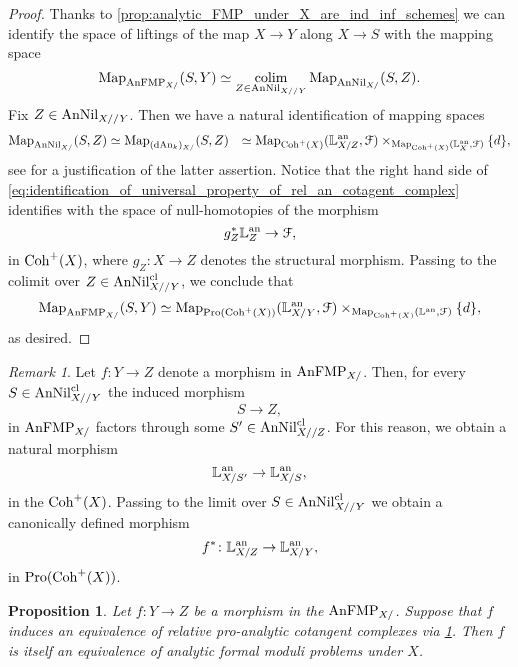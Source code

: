 \documentclass[10pt,a4paper,reqno]{amsart} %
\theoremstyle{plain}
\newtheorem{prop}[thm]{Proposition}
\theoremstyle{definition}
\theoremstyle{remark}
\newtheorem{rem}[thm]{Remark}
\numberwithin{equation}{section}
\begin{document}
\begin{proof}
    Thanks to \cref{prop:analytic_FMP_under_X_are_ind_inf_schemes} we can identify the space of liftings of the map $X \to Y$ along $X \to S$ with the mapping space
        \[
            \operatorname{Map}_{\mathrm{AnFMP}_{X/}}(S, Y) \simeq \operatorname*{colim}_{Z \in \mathrm{AnNil}_{X//Y}} \operatorname{Map}_{\mathrm{AnNil}_{X/}} (S, Z).  
        \]
    Fix $Z \in \mathrm{AnNil}_{X//Y}$. Then we have a natural identification of mapping spaces
        \begin{align} \label{eq:identification_of_universal_property_of_rel_an_cotagent_complex}
            \operatorname{Map}_{\mathrm{AnNil}_{X/}} (S, Z) & \simeq \operatorname{Map}_{(\mathrm{dAn}_k)_{X/}} (S, Z) 
                                      & \simeq \operatorname{Map}_{\mathrm{Coh}^+(X)}(\mathbb L^\mathrm{an}_{X/Z}, \mathcal F) \times_{\operatorname{Map}_{\mathrm{Coh}^+(X)}(\mathbb L^\mathrm{an}_X, \mathcal F)} \{ d \},
        \end{align}
    see \cite[\S 5.4]{Porta_Yu_Representability} for a justification of the latter assertion. Notice that the right hand side of \eqref{eq:identification_of_universal_property_of_rel_an_cotagent_complex} identifies with the space of null-homotopies of the morphism
        \[
            g_Z^* \mathbb L_Z ^\mathrm{an} \to \mathcal F,  
        \]
    in $\mathrm{Coh}^+(X)$, where $g_Z \colon X \to Z$ denotes the structural morphism. Passing to the colimit over $Z \in \mathrm{AnNil}_{X//Y}^{\mathrm{cl}}$, we conclude that
        \[
            \operatorname{Map}_{\mathrm{AnFMP}_{X/}}(S, Y) \simeq \operatorname{Map}_{\mathrm{Pro}(\mathrm{Coh}^+(X))}(\mathbb L^\mathrm{an}_{X/Y}, \mathcal F) \times_{\operatorname{Map}_{\mathrm{Coh}^+(X)}(\mathbb L^\mathrm{an}, \mathcal F)} \{ d \},
        \]
    as desired.
\end{proof}

\begin{rem} \label{rem:morphisms_of_AnFMP_induce_transition_morphisms_on_relative_analytic_cot_complexes}
    Let $f \colon Y \to Z$ denote a morphism in $\mathrm{AnFMP}_{X/}$. Then, for every $S \in \mathrm{AnNil}_{X//Y}^{\mathrm{cl}}$ the induced morphism
        \[
            S \to Z,   
        \]
    in $\mathrm{AnFMP}_{X/}$ factors through some $S' \in \mathrm{AnNil}^{\mathrm{cl}}_{X//Z}$. For this reason, we obtain a natural morphism
        \[
            \mathbb L^\mathrm{an}_{X/S'} \to \mathbb L^\mathrm{an}_{X/S},  
        \]
    in the \infcat $\mathrm{Coh}^+(X)$. Passing to the limit over $S \in \mathrm{AnNil}^{\mathrm{cl}}_{X//Y}$ we obtain a canonically defined morphism
        \[
            f^* \colon \mathbb L^\mathrm{an}_{X/Z} \to \mathbb L^\mathrm{an}_{X/Y},  
        \]
    in $\mathrm{Pro}(\mathrm{Coh}^+(X))$.
\end{rem}

\begin{prop}
    Let $f \colon Y \to Z$ be a morphism in the \infcat $\mathrm{AnFMP}_{X/}$. Suppose that $f$ induces an equivalence of relative pro-analytic cotangent complexes via
    \cref{rem:morphisms_of_AnFMP_induce_transition_morphisms_on_relative_analytic_cot_complexes}.
    Then $f$ is itself an equivalence of analytic formal moduli problems under $X$.
\end{prop}
\end{document}
